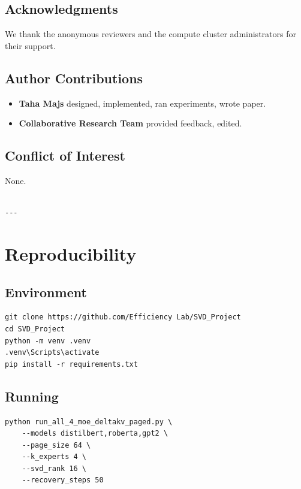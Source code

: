 \subsection{Acknowledgments}

We thank the anonymous reviewers and the compute cluster administrators for their support.

\subsection{Author Contributions}

\begin{itemize}
\item \textbf{Taha Majs} designed, implemented, ran experiments, wrote paper.
\item \textbf{Collaborative Research Team} provided feedback, edited.

\end{itemize}
\subsection{Conflict of Interest}

None.
\begin{lstlisting}

---
\end{lstlisting}

\section{Reproducibility}

\subsection{Environment}

\begin{lstlisting}
git clone https://github.com/Efficiency Lab/SVD_Project
cd SVD_Project
python -m venv .venv
.venv\Scripts\activate
pip install -r requirements.txt
\end{lstlisting}

\subsection{Running}

\begin{lstlisting}
python run_all_4_moe_deltakv_paged.py \
    --models distilbert,roberta,gpt2 \
    --page_size 64 \
    --k_experts 4 \
    --svd_rank 16 \
    --recovery_steps 50
\end{lstlisting}

